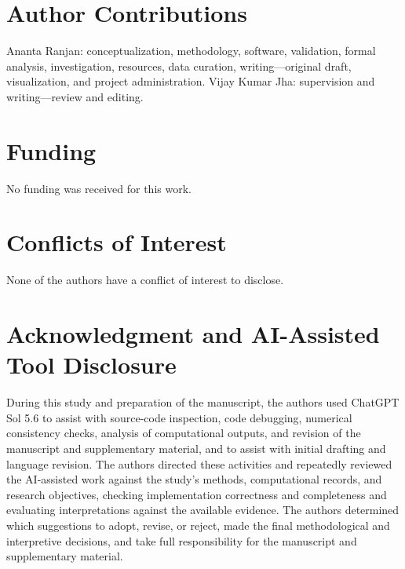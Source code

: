 \documentclass[11pt,a4paper]{article}
\begin{document}
\section*{Author Contributions}
Ananta Ranjan: conceptualization, methodology, software, validation, formal analysis, investigation, resources, data curation, writing---original draft, visualization, and project administration. Vijay Kumar Jha: supervision and writing---review and editing.

\section*{Funding}
No funding was received for this work.
\section*{Conflicts of Interest}
None of the authors have a conflict of interest to disclose.
\section*{Acknowledgment and AI-Assisted Tool Disclosure}
During this study and preparation of the manuscript, the authors used ChatGPT Sol 5.6 to assist with source-code inspection, code debugging, numerical consistency checks, analysis of computational outputs, and revision of the manuscript and supplementary material, and to assist with initial drafting and language revision. The authors directed these activities and repeatedly reviewed the AI-assisted work against the study's methods, computational records, and research objectives, checking implementation correctness and completeness and evaluating interpretations against the available evidence. The authors determined which suggestions to adopt, revise, or reject, made the final methodological and interpretive decisions, and take full responsibility for the manuscript and supplementary material.
\end{document}
